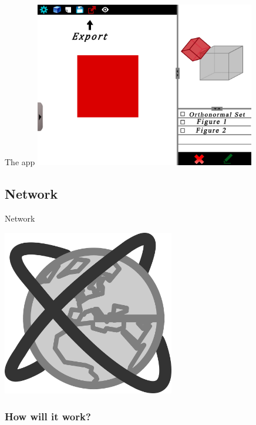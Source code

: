 \documentclass[a4paper,10pt]{beamer}
\begin{document}
			\begin{frame}{The app}
				\includegraphics[height=205pt]{maquette/maquette_8.png}
			\end{frame}
			
		\subsection{Network}
		
			\begin{frame}{Network}
			\centerline{\includegraphics[height=205pt]{images/network/network.png}}
			\end{frame}
			
			\subsubsection{How will it work?}
			
\end{document}
